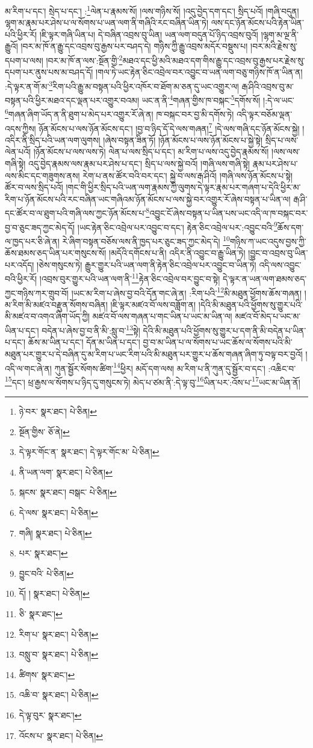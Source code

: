 མ་རིག་པ་དང་། སྲེད་པ་དང་། :\footnote{ཉེ་བར་  སྣར་ཐང་།  པེ་ཅིན། }ལེན་པ་རྣམས་སོ། །ལས་གཉིས་སོ། །འདུ་བྱེད་དག་དང་། སྲིད་པའོ། །གཞི་བདུན། ལྷག་མ་རྣམ་པར་ཤེས་པ་ལ་སོགས་པ་ཡན་ལག་ནི་གཞིའི་རང་བཞིན་ཡིན་ཏེ། ལས་དང་ཉོན་མོངས་པའི་རྟེན་ཡིན་པའི་ཕྱིར་རོ། །ཇི་ལྟར་གཞི་ཡིན་པ། དེ་བཞིན་འབྲས་བུ་ཡིན། ཡན་ལག་བདུན་པོ་ཉིད་འབྲས་བུའོ། །ལྷག་མ་ལྔ་ནི་རྒྱུའོ། །བར་མ་ཁོ་ན་རྒྱུ་དང་འབྲས་བུ་རྒྱས་པར་བཤད་དེ། གཉིས་ཀྱི་རྒྱུ་འབྲས་མདོར་བསྡུས་པ། །བར་མའི་རྗེས་སུ་དཔག་པ་ལས། །བར་མ་ཁོ་ན་ལས་:སྔོན་གྱི་\footnote{སྔོན་གྱིས་  ཅོ་ནེ། }མཐའ་དང་ཕྱི་མའི་མཐའ་དག་གིས་རྒྱུ་དང་འབྲས་བུ་རྒྱས་པར་རྗེས་སུ་དཔག་པར་ནུས་པས་མ་བཤད་དོ། །གལ་ཏེ་ཡང་རྟེན་ཅིང་འབྲེལ་བར་འབྱུང་བ་ཡན་ལག་བཅུ་གཉིས་ཁོ་ན་ཡིན་ན། :དེ་ལྟར་ན་གོ་མ་\footnote{དེ་ལྟར་གོང་ན་  སྣར་ཐང་། དེ་ལྟར་གོང་མ་  པེ་ཅིན། }རིག་པའི་རྒྱུ་མ་བསྟན་པའི་ཕྱིར་འཁོར་བ་ཐོག་མ་ཅན་དུ་ཡང་འགྱུར་ལ། རྒ་ཤིའི་འབྲས་བུ་མ་བསྟན་པའི་ཕྱིར་མཐའ་དང་ལྡན་པར་འགྱུར་བའམ། ཡང་ན་ནི་\footnote{ནི་ཡན་ལག་  སྣར་ཐང་།  པེ་ཅིན། }གཞན་གྱིས་ཁ་བསྐང་\footnote{སྐངས་  སྣར་ཐང་། བསྒང་  པེ་ཅིན། }དགོས་སོ། །:དེ་ལ་ཡང་\footnote{དེ་ལས་  སྣར་ཐང་།  པེ་ཅིན། }གཞན་ཞིག་ཡོད་ན་ནི་ཐུག་པ་མེད་པར་འགྱུར་རོ་ཞེ་ན། ཁ་བསྐང་བར་བྱ་མི་དགོས་ཏེ། འདི་ལྟར་བཅོམ་ལྡན་འདས་ཀྱིས། ཉོན་མོངས་པ་ལས་ཉོན་མོངས་དང་། །བྱ་བ་ཉིད་དོ་དེ་ལས་གཞན།\footnote{གཞི།  སྣར་ཐང་།  པེ་ཅིན། } །དེ་ལས་གཞི་དང་ཉོན་མོངས་སྐྱེ། །འདིར་ནི་སྲིད་པའི་ཡན་ལག་ལུགས། །ཞེས་བསྟན་ཟིན་ཏོ། །ཉོན་མོངས་པ་ལས་ཉོན་མོངས་པ་སྐྱེ་སྟེ། སྲིད་པ་ལས་ལེན་པའོ། །ཉོན་མོངས་པ་ལས་ལས་ཏེ། ལེན་པ་ལས་སྲིད་པ་དང་། མ་རིག་པ་ལས་འདུ་བྱེད་རྣམས་སོ། །ལས་ལས་གཞི་སྟེ། འདུ་བྱེད་རྣམས་ལས་རྣམ་པར་ཤེས་པ་དང་། སྲིད་པ་ལས་སྐྱེ་བའོ། །གཞི་ལས་གཞི་སྟེ། རྣམ་པར་ཤེས་པ་ལས་མིང་དང་གཟུགས་ནས། རེག་པ་ནས་ཚོར་བའི་བར་དང་། སྐྱེ་བ་ལས་རྒ་ཤིའོ། །གཞི་ལས་ཉོན་མོངས་པ་སྟེ། ཚོར་བ་ལས་སྲིད་པའོ། །གང་གི་ཕྱིར་སྲིད་པའི་ཡན་ལག་རྣམས་ཀྱི་ལུགས་དེ་ལྟར་རྣམ་པར་གཞག་པ་དེའི་ཕྱིར་མ་རིག་པ་ཉོན་མོངས་པའི་རང་བཞིན་ཡང་གཞིའམ་ཉོན་མོངས་པ་ལས་སྐྱེ་བར་འགྱུར་རོ་ཞེས་བསྟན་པ་ཡིན་ལ། རྒ་ཤི་དང་ཚོར་བ་ལ་ཐུག་པའི་གཞི་ལས་ཀྱང་ཉོན་མོངས་པ་\footnote{པར་  སྣར་ཐང་། }འབྱུང་ངོ་ཞེས་བསྟན་པ་ཡིན་པས་ཡང་འདི་ལ་ཁ་བསྐང་བར་བྱ་བ་ཅུང་ཟད་ཀྱང་མེད་དོ། །ཡང་རྟེན་ཅིང་འབྲེལ་པར་འབྱུང་བ་དང་། རྟེན་ཅིང་འབྲེལ་པར་:འབྱུང་བའི་\footnote{བྱུང་བའི་  པེ་ཅིན། }ཆོས་དག་ལ་ཁྱད་པར་ཅི་ཞེ་ན། རེ་ཞིག་བསྟན་བཅོས་ལས་ནི་ཁྱད་པར་ཅུང་ཟད་ཀྱང་མེད་དེ། \footnote{དོ། །   སྣར་ཐང་།  པེ་ཅིན། }གཉིས་ཀ་ཡང་འདུས་བྱས་ཀྱི་ཆོས་ཐམས་ཅད་ཡིན་པར་གསུངས་སོ། །མདོའི་དགོངས་པ་ནི། འདིར་ནི་འབྱུང་བ་རྒྱུ་ཡིན་ཏེ། །བྱུང་བ་འབྲས་བུ་ཡིན་པར་འདོད། །ཅེས་གསུངས་ཏེ། རྒྱུར་གྱུར་པའི་ཡན་ལག་ནི་རྟེན་ཅིང་འབྲེལ་པར་འབྱུང་བ་ཡིན་ཏེ། འདི་ལས་འབྱུང་བའི་ཕྱིར་རོ། །འབྲས་བུར་གྱུར་པའི་ཡན་ལག་ནི་\footnote{ཅི་  སྣར་ཐང་། }རྟེན་ཅིང་འབྲེལ་བར་བྱུང་བ་སྟེ། དེ་ལྟར་ན་ཡན་ལག་ཐམས་ཅད་ཀྱང་གཉིས་ཀར་གྲུབ་བོ། །ཡང་མ་རིག་པ་ཞེས་བྱ་བའི་དོན་གང་ཞེ་ན། :རིག་པའི་\footnote{རིག་པ་  སྣར་ཐང་།  པེ་ཅིན། }མི་མཐུན་ཕྱོགས་ཆོས་གཞན། །མ་རིག་མི་མཛའ་བརྫུན་སོགས་བཞིན། །ཇི་ལྟར་མཛའ་བོ་ལས་བཟློག་ན། །དེའི་མི་མཐུན་པའི་ཕྱོགས་སུ་གྱུར་པའི་མི་མཛའ་བ་འགའ་ཞིག་ཡོད་ཀྱི། མཛའ་བོ་ལས་གཞན་པ་གང་ཡིན་པ་ཡང་མ་ཡིན་ལ། མཛའ་བོ་མེད་པ་ཡང་མ་ཡིན་པ་དང་། བདེན་པ་ཞེས་བྱ་བ་ནི་མི་:སླུ་བ་\footnote{བསླུ་བ་  སྣར་ཐང་།  པེ་ཅིན། }སྟེ། དེའི་མི་མཐུན་པའི་ཕྱོགས་སུ་གྱུར་པ་དག་ནི་མི་བདེན་པ་ཡིན་པ་དང་། ཆོས་མ་ཡིན་པ་དང་། དོན་མ་ཡིན་པ་དང་། བྱ་བ་མ་ཡིན་པ་ལ་སོགས་པ་ཡང་ཆོས་ལ་སོགས་པའི་མི་མཐུན་པར་གྱུར་པ་དེ་བཞིན་དུ་མ་རིག་པ་ཡང་རིག་པའི་མི་མཐུན་པར་གྱུར་པ་ཆོས་གཞན་ཞིག་ཏུ་བལྟ་བར་བྱའོ། །འདི་ལ་གང་ཞེ་ན། ཀུན་སྦྱོར་སོགས་ཚིག་\footnote{ཚིགས་  སྣར་ཐང་། }ཕྱིར། མདོ་དག་ལས། མ་རིག་པ་ནི་ཀུན་དུ་སྦྱོར་བ་དང་། :འཆིང་བ་\footnote{འཆི་བ་  སྣར་ཐང་།  པེ་ཅིན། }དང་། ཕྲ་རྒྱས་ལ་སོགས་པ་ཉིད་དུ་གསུངས་ཏེ། མེད་པ་ཙམ་ནི་:དེ་ལྟ་བུ་\footnote{དེ་ལྟ་བུར་  སྣར་ཐང་། }ཡིན་པར་:འོས་པ་\footnote{འོངས་པ་  སྣར་ཐང་།  པེ་ཅིན། }ཡང་མ་ཡིན་ནོ། 